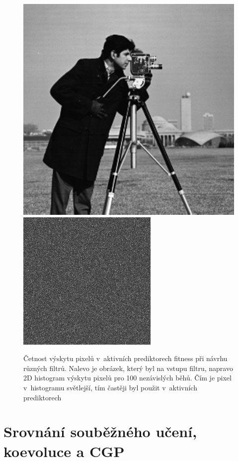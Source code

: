 \begin{figure}[hbt]
{        \includegraphics[width=\size]{fig/testimages/cameraman.png}
        \gap
        \includegraphics[width=\size]{fig/predhist/sobel.png}
        \margin
    }

    \caption{Četnost výskytu pixelů v~aktivních prediktorech fitness při návrhu různých filtrů. Nalevo je obrázek, který byl na vstupu filtru, napravo 2D histogram výskytu pixelů pro 100 nezávislých běhů. Čím je pixel v~histogramu světlejší, tím častěji byl použit v~aktivních prediktorech}
    \label{obrPredhist}
\end{figure}

\section{Srovnání souběžného učení, koevoluce a CGP}
\label{secExpComparison}

